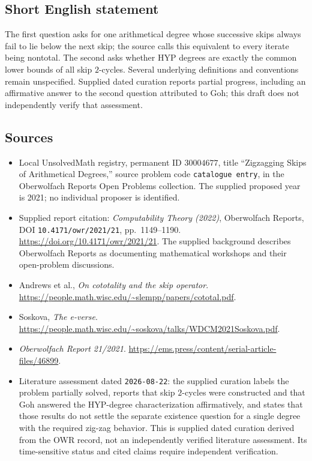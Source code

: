 \documentclass[11pt]{article}
\begin{document}
\subsection{Short English statement}
The first question asks for one arithmetical degree whose successive skips always fail to lie below the next skip; the source calls this equivalent to every iterate being nontotal. The second asks whether HYP degrees are exactly the common lower bounds of all skip \(2\)-cycles. Several underlying definitions and conventions remain unspecified. Supplied dated curation reports partial progress, including an affirmative answer to the second question attributed to Goh; this draft does not independently verify that assessment.
\subsection{Sources}
\begin{itemize}
\item Local UnsolvedMath registry, permanent ID \(30004677\), title ``Zigzagging Skips of Arithmetical Degrees,'' source problem code \texttt{catalogue entry}, in the Oberwolfach Reports Open Problems collection. The supplied proposed year is 2021; no individual proposer is identified.
\item Supplied report citation: \emph{Computability Theory (2022)}, Oberwolfach Reports, DOI \texttt{10.4171/owr/2021/21}, pp.\ 1149--1190. \url{https://doi.org/10.4171/owr/2021/21}. The supplied background describes Oberwolfach Reports as documenting mathematical workshops and their open-problem discussions.
\item Andrews et al., \emph{On cototality and the skip operator}. \url{https://people.math.wisc.edu/~slempp/papers/cototal.pdf}.
\item Soskova, \emph{The e-verse}. \url{https://people.math.wisc.edu/~soskova/talks/WDCM2021Soskova.pdf}.
\item \emph{Oberwolfach Report 21/2021}. \url{https://ems.press/content/serial-article-files/46899}.
\item Literature assessment dated \texttt{2026-08-22}: the supplied curation labels the problem partially solved, reports that skip \(2\)-cycles were constructed and that Goh answered the HYP-degree characterization affirmatively, and states that those results do not settle the separate existence question for a single degree with the required zig-zag behavior. This is supplied dated curation derived from the OWR record, not an independently verified literature assessment. Its time-sensitive status and cited claims require independent verification.
\end{itemize}
\end{document}
